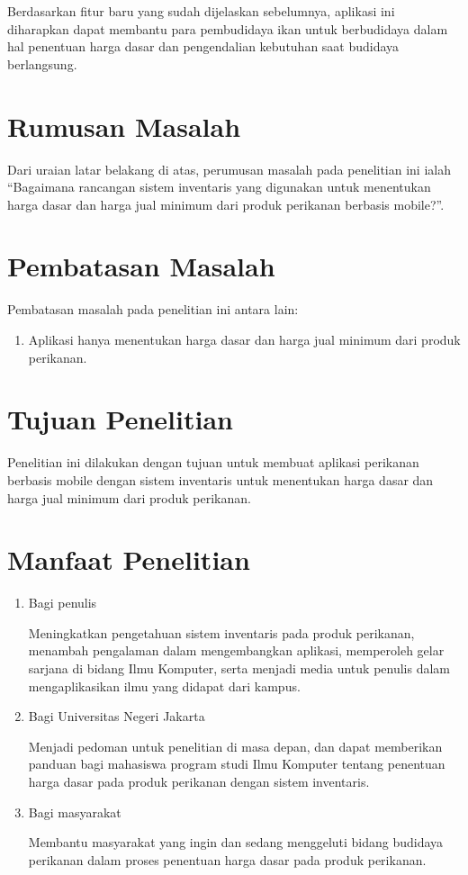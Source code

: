 Berdasarkan fitur baru yang sudah dijelaskan sebelumnya, aplikasi ini diharapkan dapat membantu para pembudidaya ikan untuk berbudidaya dalam hal penentuan harga dasar dan pengendalian kebutuhan saat budidaya berlangsung. 

\section{Rumusan Masalah}
Dari uraian latar belakang di atas, perumusan masalah pada penelitian ini ialah “Bagaimana rancangan sistem inventaris yang digunakan untuk menentukan harga dasar dan harga jual minimum dari produk perikanan berbasis mobile?”.

\section{Pembatasan Masalah}
Pembatasan masalah pada penelitian ini antara lain:
\begin{enumerate}
	\item Aplikasi hanya menentukan harga dasar dan harga jual minimum dari produk perikanan.
\end{enumerate}

\section{Tujuan Penelitian}
	Penelitian ini dilakukan dengan tujuan untuk membuat aplikasi perikanan berbasis mobile dengan sistem inventaris untuk menentukan harga dasar dan harga jual minimum dari produk perikanan.

\section{Manfaat Penelitian}
\begin{enumerate}
	\item Bagi penulis
		
	Meningkatkan pengetahuan sistem inventaris pada produk perikanan, menambah pengalaman dalam mengembangkan aplikasi, memperoleh gelar sarjana di bidang Ilmu Komputer, serta menjadi media untuk penulis dalam mengaplikasikan ilmu yang didapat dari kampus.
		
	\item Bagi Universitas Negeri Jakarta
	 	
	Menjadi pedoman untuk penelitian di masa depan, dan dapat memberikan panduan bagi mahasiswa program studi Ilmu Komputer tentang penentuan harga dasar pada produk perikanan dengan sistem inventaris.
	
	\item Bagi masyarakat
	 	
	Membantu masyarakat yang ingin dan sedang menggeluti bidang budidaya perikanan dalam proses penentuan harga dasar pada produk perikanan.
	 			
\end{enumerate}


\begin{comment}

\end{comment}
